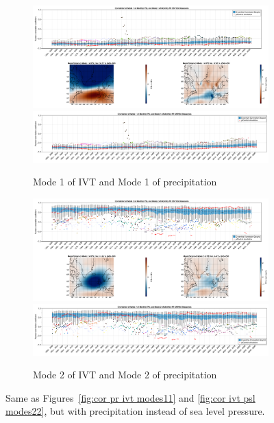 \begin{figure}[!tbp]
  \begin{subfigure}[b]{0.49\textwidth}
    \includegraphics[width=\textwidth]{figures/correlation_boxplot_psl_pr_modes11_ssp126_50seasons.png}
    \includegraphics[width=\textwidth]{figures/correlation_boxplot_psl_pr_modes11_ssp585_50seasons.png}
    \caption{Mode 1 of IVT and Mode 1 of precipitation}
    \label{fig:cor psl pr modes11}
  \end{subfigure}
  \hfill
  \begin{subfigure}[b]{0.49\textwidth}
    \includegraphics[width=\textwidth]{figures/correlation_boxplot_psl_pr_modes22_ssp126_50seasons.png}
    \includegraphics[width=\textwidth]{figures/correlation_boxplot_psl_pr_modes22_ssp585_50seasons.png}
    \caption{Mode 2 of IVT and Mode 2 of precipitation}
    \label{fig:cor psl pr modes22}
  \end{subfigure}
  \caption{Same as Figures~\ref{fig:cor pr ivt modes11} and \ref{fig:cor ivt psl modes22}, but with precipitation instead of sea level pressure.}
\end{figure}

